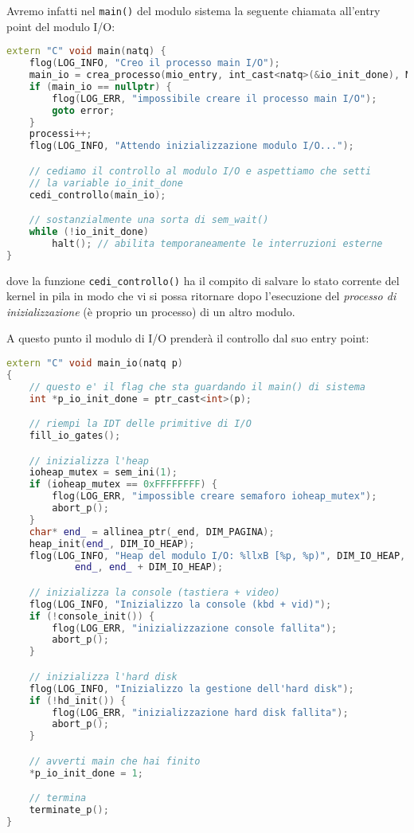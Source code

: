 \documentclass[a4paper,11pt]{article}
\begin{document}
Avremo infatti nel \lstinline|main()| del modulo sistema la seguente chiamata all'entry point del modulo I/O:
\begin{lstlisting}[language=C++, style=codestyle]	
extern "C" void main(natq) {
	flog(LOG_INFO, "Creo il processo main I/O");
	main_io = crea_processo(mio_entry, int_cast<natq>(&io_init_done), MAX_EXT_PRIO, LIV_SISTEMA);
	if (main_io == nullptr) {
		flog(LOG_ERR, "impossibile creare il processo main I/O");
		goto error;
	}
	processi++;
	flog(LOG_INFO, "Attendo inizializzazione modulo I/O...");

	// cediamo il controllo al modulo I/O e aspettiamo che setti
	// la variable io_init_done
	cedi_controllo(main_io);

	// sostanzialmente una sorta di sem_wait()
	while (!io_init_done) 
		halt();	// abilita temporaneamente le interruzioni esterne
}
\end{lstlisting}
dove la funzione \lstinline|cedi_controllo()| ha il compito di salvare lo stato corrente del kernel in pila in modo che vi si possa ritornare dopo l'esecuzione del \textit{processo di inizializzazione} (è proprio un processo) di un altro modulo.

A questo punto il modulo di I/O prenderà il controllo dal suo entry point:
\begin{lstlisting}[language=C++, style=codestyle]	
extern "C" void main_io(natq p)
{
	// questo e' il flag che sta guardando il main() di sistema
	int *p_io_init_done = ptr_cast<int>(p);

	// riempi la IDT delle primitive di I/O
	fill_io_gates();

	// inizializza l'heap
	ioheap_mutex = sem_ini(1);
	if (ioheap_mutex == 0xFFFFFFFF) {
		flog(LOG_ERR, "impossible creare semaforo ioheap_mutex");
		abort_p();
	}
	char* end_ = allinea_ptr(_end, DIM_PAGINA);
	heap_init(end_, DIM_IO_HEAP);
	flog(LOG_INFO, "Heap del modulo I/O: %llxB [%p, %p)", DIM_IO_HEAP,
			end_, end_ + DIM_IO_HEAP);

	// inizializza la console (tastiera + video)
	flog(LOG_INFO, "Inizializzo la console (kbd + vid)");
	if (!console_init()) {
		flog(LOG_ERR, "inizializzazione console fallita");
		abort_p();
	}

	// inizializza l'hard disk
	flog(LOG_INFO, "Inizializzo la gestione dell'hard disk");
	if (!hd_init()) {
		flog(LOG_ERR, "inizializzazione hard disk fallita");
		abort_p();
	}

	// avverti main che hai finito
	*p_io_init_done = 1;

	// termina
	terminate_p();
}
\end{lstlisting}
\end{document}
